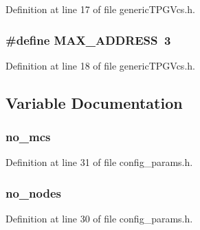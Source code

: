 Definition at line 17 of file genericTPGVcs.h.
\subsubsection[{MAX\_\-ADDRESS}]{\setlength{\rightskip}{0pt plus 5cm}\#define MAX\_\-ADDRESS~3}\label{genericTPGVcs_8h_aba07841c3e227bc8bdd8ccdad149349}




Definition at line 18 of file genericTPGVcs.h.

\subsection{Variable Documentation}
\subsubsection[{no\_\-mcs}]{ {\bf no\_\-mcs}}\label{genericTPGVcs_8h_56d27d790e05179f3787fce80d802d04}




Definition at line 31 of file config\_\-params.h.
\subsubsection[{no\_\-nodes}]{ {\bf no\_\-nodes}}\label{genericTPGVcs_8h_b78c10782810279fb9680eafef33b77d}




Definition at line 30 of file config\_\-params.h.